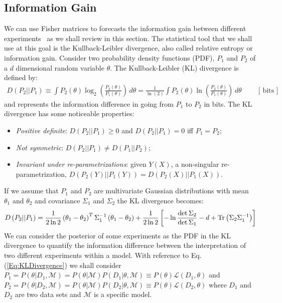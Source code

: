 \documentclass[prd,nofootinbib,showpacs]{revtex4}
\begin{document}
\subsection{Information Gain}
%
We can use Fisher matrices to forecasts the information gain between different experiments~\cite{Seehars:2014ora} as we shall review in this section.
%
The statistical tool that we shall use at this goal is the Kullback-Leibler divergence, also called relative entropy or information gain.
%
Consider two probability density functions (PDF), $P_1$ and $P_2$ of a $d$ dimensional random variable $\theta$. The Kullback-Leibler (KL) divergence is defined by:
%
\begin{align} \label{Eq:KLDivergence}
D\left( P_2 || P_ 1 \right) \equiv \int P_2(\theta) \log_{2}\left(\frac{P_2(\theta)}{P_1(\theta)} \right)  \, d\theta = \frac{1}{\ln(2)}\int P_2(\theta) \ln\left(\frac{P_2(\theta)}{P_1(\theta)} \right)  \, d\theta \hspace{1cm} \mbox{[ bits ]}
\end{align}
%
and represents the information difference in going from $P_1$ to $P_2$ in bits.
The KL divergence has some noticeable properties:
%
\begin{itemize}
\item {\it Positive definite}: $D\left( P_2 || P_ 1 \right)\geq 0$ and $D\left( P_2 || P_ 1 \right)=0$ iff $P_1=P_2$;
\item {\it Not symmetric}: $D\left( P_2 || P_ 1 \right)\neq D\left( P_1 || P_ 2 \right)$;
\item {\it Invariant under re-parametrizations}: given $Y(X)$, a non-singular re-parametrization, $D\left( P_2(Y) || P_ 1(Y) \right)=D\left( P_2(X) || P_ 1(X) \right)$.
\end{itemize}
%
If we assume that $P_1$ and $P_2$ are multivariate Gaussian distributions with mean $\theta_1$ and $\theta_2$ and covariance $\Sigma_1$ and $\Sigma_2$ the KL divergence becomes:
%
\begin{align} \label{Eq:KLDivergenceGaussian}
D\left( P_2 || P_ 1 \right) = \frac{1}{2\ln 2}\left( \theta_1 - \theta_2 \right)^{T} \Sigma_1^{-1} \left( \theta_1 - \theta_2 \right) + \frac{1}{2\ln 2}\left[ -\ln\frac{\det \Sigma_2}{\det \Sigma_1} -d +{\rm Tr} \left( \Sigma_2\Sigma_1^{-1} \right)\right]
\end{align}
%
We can consider the posterior of some experiments as the PDF in the KL divergence to quantify the information difference between the interpretation of two different experiments within a model.
With reference to Eq. (\ref{Eq:KLDivergence}) we shall consider $P_1= P(\theta | D_1, \mathcal{M} ) = P(\theta | \mathcal{M}) P( D_1 | \theta, \mathcal{M}) \equiv P(\theta) \mathcal{L}( D_1, \theta)$ and $P_2= P(\theta | D_2, \mathcal{M} ) = P(\theta | \mathcal{M}) P( D_2 | \theta, \mathcal{M}) \equiv P(\theta) \mathcal{L}( D_2, \theta)$ where $D_1$ and $D_2$ are two data sets and $\mathcal{M}$ is a specific model. \\
\end{document}
